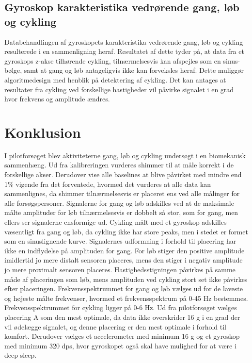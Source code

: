 \subsection{Gyroskop karakteristika vedrørende gang, løb og cykling}
Databehandlingen af gyroskopets karakteristika vedrørende gang, løb og cykling resulterede i en sammenligning heraf. Resultatet af dette tyder på, at data fra et gyroskops z-akse tilhørende cykling, tilnærmelsesvis kan afspejles som en sinus-bølge, samt at gang og løb antageligvis ikke kan forveksles heraf. Dette muliggør algoritmedesign med henblik på detektering af cykling. Det kan antages at resultater fra cykling ved forskellige hastigheder vil påvirke signalet i en grad hvor frekvens og amplitude ændres.

\section{Konklusion}
I pilotforsøget blev aktiviteterne gang, løb og cykling undersøgt i en biomekanisk sammenhæng. Ud fra kalibreringen vurderes shimmer til at måle korrekt i de forskellige akser. Derudover vise alle baselines at blive påvirket med mindre end 1\% vigende fra det forventede, hvormed det vurderes at alle data kan sammenlignes, da shimmer tilnærmelsesvis er placeret ens ved alle målinger for alle forsøgspersoner. \newline
Signalerne for gang og løb adskilles ved at de maksimale målte amplituder for løb tilnærmelsesvis er dobbelt så stor, som for gang, men ellers ser signalerne ensformige ud. Cykling målt med et gyroskop adskilles væsentligt fra gang og løb, da cykling ikke har store peaks, men i stedet er formet som en sinuslignende kurve. \newline
Signalernes udformning i forhold til placering har ikke en indflydelse på amplituden for gang. For løb stiger den positive amplitude imidlertid jo mere distalt sensoren placeres, mens den stiger i negativ amplitude jo mere proximalt sensoren placeres. Hastighedsstigningen påvirkes på samme måde af placeringen som løb, mens amplituden ved cykling stort set ikke påvirkes efter placeringen. \newline
Frekvensspektrummet for gang og løb vælges ud for de laveste og højeste målte frekvenser, hvormed et frekvensspektrum på 0-45 Hz bestemmes. Frekvensspektrummet for cykling ligger på 0-6 Hz.\newline
Ud fra pilotforsøget vælges placering A som den mest optimale, da data ikke overskrider 16 g i en grad der vil ødelægge signalet, og denne placering er den mest optimale i forhold til komfort. Derudover vælges et accelerometer med minimum 16 g og et gyroskop med minimum 320 dps, hvor gyroskopet også skal have mulighed for at være i deep sleep. 



